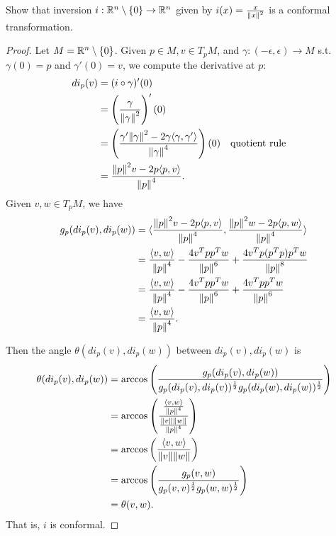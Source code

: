 \documentclass[12pt]{article}
\begin{document}
\begin{problem}[LN12 0.2.1]
Show that inversion $ i: \mathbb{R}^{n}\setminus  \{0\} \to \mathbb{R}^{n} $ given by $ i(x) = \frac{x}{{\left\lVert{ x}\right\rVert} ^2}$ is a conformal transformation.
\end{problem}
\begin{proof}
Let $ M = \mathbb{R}^{n}\setminus \{0\} $. Given $ p \in M, v \in T_pM $, and $ \gamma: (- \epsilon, \epsilon) \to M $ s.t.\ $ \gamma(0) = p$ and $ \gamma'(0) = v$, we compute the derivative at $ p$:
\begin{align*}
	di_p(v) &= (i \circ \gamma)'(0)\\
		&= \left( \frac{\gamma}{ {\left\lVert{ \gamma}\right\rVert}^2 } \right)'(0)\\
		&= \left( \frac{ \gamma' {\left\lVert{ \gamma}\right\rVert}^2 - 2 \gamma \langle \gamma, \gamma' \rangle}{ {\left\lVert{ \gamma}\right\rVert}^{4}  } \right)(0) && \text{quotient rule}  \\
		&= \frac{{\left\lVert{ p}\right\rVert}^2 v - 2 p \langle p,v \rangle}{ {\left\lVert{ p}\right\rVert}^{4}  } .
\end{align*}
 Given $ v,w \in T_pM$, we have
 \begin{align*}
	 g_p ( di_p(v),di_p(w) )&= \langle \frac{{\left\lVert{ p}\right\rVert}^2 v - 2p \langle p,v \rangle}{ {\left\lVert{ p}\right\rVert}^{4}  }, \frac{{\left\lVert{ p}\right\rVert}^2 w - 2 p \langle p,w \rangle }{ {\left\lVert{ p}\right\rVert}^{4}  }\rangle \\
	 &=  \frac{ \langle v,w \rangle}{{\left\lVert{ p}\right\rVert}^4 } - \frac{4 v^{T}pp ^{T} w}{ {\left\lVert{ p}\right\rVert}^{6} } + \frac{4 v^{T}p(p ^{T}p)p ^{T}w}{ {\left\lVert{ p}\right\rVert}^{8} }\\
	 &=  \frac{ \langle v,w \rangle}{{\left\lVert{ p}\right\rVert}^4 } - \frac{4 v^{T}pp ^{T} w}{ {\left\lVert{ p}\right\rVert}^{6} } + \frac{4 v^{T}pp ^{T}w}{ {\left\lVert{ p}\right\rVert}^{6} }\\
	 &= \frac{\langle v,w \rangle}{ {\left\lVert{ p}\right\rVert}^{4} } .
 \end{align*}

Then the angle $ \theta(di_p(v),di_p(w))$ between $ di_p(v),di_p(w)$ is
\begin{align*}
	\theta(di_p(v),di_p(w)) &= \arccos \left( \frac{g_p ( di_p(v),di_p(w) ) }{ g_p(di_p(v),di_p(v))^{\frac{1}{2}} g_p(di_p(w),di_p(w))^{\frac{1}{2}}} \right) \\
	&= \arccos \left( \frac{ \frac{\langle v,w \rangle}{ {\left\lVert{ p}\right\rVert} ^{4}}}{ \frac{{\left\lVert{ v}\right\rVert} {\left\lVert{ w}\right\rVert}  }{ {\left\lVert{ p}\right\rVert}^{4} }  } \right)  \\
	&= \arccos \left( \frac{\langle v,w \rangle}{ {\left\lVert{ v}\right\rVert} {\left\lVert{ w}\right\rVert} } \right)  \\
	&= \arccos \left( \frac{g_p(v,w)}{ g_p(v,v)^{\frac{1}{2}} g_p(w,w)^{\frac{1}{2}}} \right)  \\
	&= \theta(v,w) .
\end{align*}
That is, $ i$ is conformal.
\end{proof}
\end{document}
